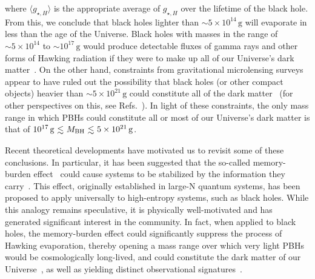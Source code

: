 where $\langle g_{\star, H} \rangle$ is the appropriate average of $g_{\star, H}$ over the lifetime of the black hole. From this, we conclude that black holes lighter than $\sim 5 \times 10^{14}\,\mathrm{g}$ will evaporate in less than the age of the Universe. Black holes with masses in the range of $\sim 5 \times 10^{14}$ to $\sim 10^{17}\,\mathrm{g}$ would produce detectable fluxes of gamma rays and other forms of Hawking radiation if they were to make up all of our Universe's dark matter~\cite{Coogan:2020tuf, Boudaud:2018hqb, Laha:2020ivk, Keith:2021guq, Dasgupta:2019cae}. On the other hand, constraints from gravitational microlensing surveys appear to have ruled out the possibility that black holes (or other compact objects) heavier than $\sim 5 \times 10^{21}\,\mathrm{g}$ could constitute all of the dark matter~\cite{Macho:2000nvd, EROS-2:2006ryy, Griest:2013aaa, Oguri:2017ock, Niikura:2019kqi, Croon:2020ouk} (for other perspectives on this, see Refs.~\cite{Carr:2023tpt,Garcia-Bellido:2024yaz}). In light of these constraints, the only mass range in which PBHs could constitute all or most of our Universe's dark matter is that of $10^{17}\,\mathrm{g} \lsim M_\mathrm{BH} \lsim 5 \times 10^{21}\,\mathrm{g}$.

Recent theoretical developments have motivated us to revisit some of these conclusions. In particular, it has been suggested that the so-called memory-burden effect~\cite{Dvali:2018xpy, Dvali:2018ytn} could cause systems to be stabilized by the information they carry~\cite{Dvali:2020wft}. This effect, originally established in large-N quantum systems, has been proposed to apply universally to high-entropy systems, such as black holes. While this analogy remains speculative, it is physically well-motivated and has generated significant interest in the community. In fact, when applied to black holes, the memory-burden effect could significantly suppress the process of Hawking evaporation, thereby opening a mass range over which very light PBHs would be cosmologically long-lived, and could constitute the dark matter of our Universe~\cite{Dvali:2020wft, Alexandre:2024nuo, Dvali:2024hsb, Thoss:2024hsr},  as well as yielding distinct observational signatures~\cite{Zantedeschi:2024ram,Kohri:2024qpd,Barman:2024iht,Jiang:2024aju,Bhaumik:2024qzd}.

